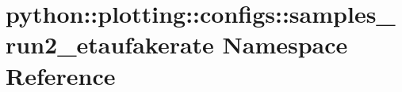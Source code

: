 \hypertarget{namespacepython_1_1plotting_1_1configs_1_1samples__run2__etaufakerate}{
\section{python::plotting::configs::samples\_\-run2\_\-etaufakerate Namespace Reference}
\label{namespacepython_1_1plotting_1_1configs_1_1samples__run2__etaufakerate}
}
